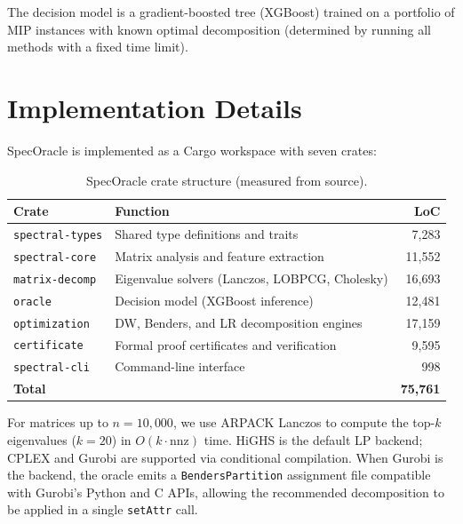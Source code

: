 \documentclass[11pt]{article}
\begin{document}
The decision model is a gradient-boosted tree (XGBoost) trained on a portfolio of MIP instances with known optimal decomposition (determined by running all methods with a fixed time limit).

\section{Implementation Details}
\label{sec:impl}

SpecOracle is implemented as a Cargo workspace with seven crates:

\begin{table}[h]
\centering
\caption{SpecOracle crate structure (measured from source).}
\begin{tabular}{llr}
\toprule
\textbf{Crate} & \textbf{Function} & \textbf{LoC} \\
\midrule
\texttt{spectral-types}  & Shared type definitions and traits                 & 7,283 \\
\texttt{spectral-core}   & Matrix analysis and feature extraction              & 11,552 \\
\texttt{matrix-decomp}   & Eigenvalue solvers (Lanczos, LOBPCG, Cholesky)     & 16,693 \\
\texttt{oracle}          & Decision model (XGBoost inference)                 & 12,481 \\
\texttt{optimization}    & DW, Benders, and LR decomposition engines          & 17,159 \\
\texttt{certificate}     & Formal proof certificates and verification         & 9,595 \\
\texttt{spectral-cli}    & Command-line interface                             & 998 \\
\midrule
\textbf{Total} & & \textbf{75,761} \\
\bottomrule
\end{tabular}
\end{table}

For matrices up to $n=10{,}000$, we use ARPACK Lanczos to compute the top-$k$ eigenvalues ($k=20$) in $O(k \cdot \text{nnz})$ time. HiGHS is the default LP backend; CPLEX and Gurobi are supported via conditional compilation. When Gurobi is the backend, the oracle emits a \texttt{BendersPartition} assignment file compatible with Gurobi's Python and C APIs, allowing the recommended decomposition to be applied in a single \texttt{setAttr} call.
\end{document}
